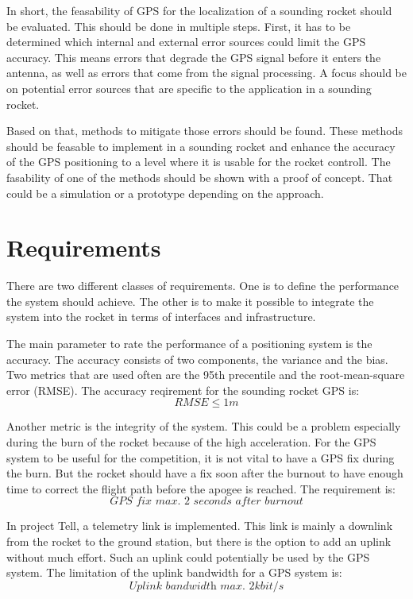 In short, the feasability of GPS for the localization of a sounding rocket should be evaluated.
This should be done in multiple steps.
First, it has to be determined which internal and external error sources could limit the GPS accuracy.
This means errors that degrade the GPS signal before it enters the antenna, as well as errors that come from the signal processing.
A focus should be on potential error sources that are specific to the application in a sounding rocket.

Based on that, methods to mitigate those errors should be found.
These methods should be feasable to implement in a sounding rocket and enhance the accuracy of the GPS positioning to a level where it is usable for the rocket controll.
The fasability of one of the methods should be shown with a proof of concept.
That could be a simulation or a prototype depending on the approach.


\section{Requirements}\label{Requirements}

There are two different classes of requirements.
One is to define the performance the system should achieve.
The other is to make it possible to integrate the system into the rocket in terms of interfaces and infrastructure.

The main parameter to rate the performance of a positioning system is the accuracy.
The accuracy consists of two components, the variance and the bias.
Two metrics that are used often are the 95th precentile and the root-mean-square error (RMSE).
The accuracy reqirement for the sounding rocket GPS is:
$$ RMSE \le 1m $$

Another metric is the integrity of the system.
This could be a problem especially during the burn of the rocket because of the high acceleration.
For the GPS system to be useful for the competition, it is not vital to have a GPS fix during the burn.
But the rocket should have a fix soon after the burnout to have enough time to correct the flight path before the apogee is reached.
The requirement is:
$$ \textit{GPS fix max. 2 seconds after burnout} $$

In project Tell, a telemetry link is implemented.
This link is mainly a downlink from the rocket to the ground station, but there is the option to add an uplink without much effort.
Such an uplink could potentially be used by the GPS system.
The limitation of the uplink bandwidth for a GPS system is:
$$ \textit{Uplink bandwidth max. 2kbit/s} $$